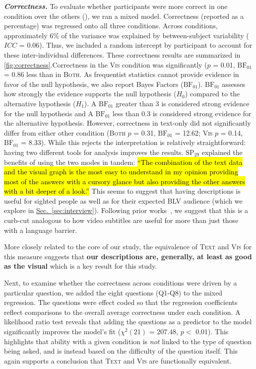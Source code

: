 \documentclass{egpubl}
\newcommand{\secref}[1]{\hyperref[#1]{Sec.~\ref*{#1}}}
\newcommand{\hlc}[2][yellow]{{\colorlet{foo}{#1}\sethlcolor{foo}\hl{#2}}}
\newcommand\sqt[1]{\hlc[surveyQuoteColor!20]{``#1''}}
\newcommand{\condition}[1]{\textsc{#1}}
\newcommand{\condVis}{\condition{Vis}}
\newcommand{\condText}{\condition{Text}}
\newcommand{\condBoth}{\condition{Both}}
\newcommand{\sx}[1]{SP$_{#1}$}
\newcommand{\parahead}[1]
{\vspace{0.25em}\noindent \textbf{\textit{#1.}}}
\begin{document}
\parahead{Correctness}
To evaluate whether participants were more correct in one condition over the others (\hAcc{}), we ran a mixed model. Correctness (reported as a percentage) was regressed onto all three conditions. Across conditions, approximately 6\% of the variance was explained by between-subject variability ($ICC$ = 0.06). Thus, we included a random intercept by participant to account for these inter-individual differences.
These correctness results are summarized in \autoref{fig:correctness}.Correctness in the \condVis{} condition was significantly ($p$ = 0.01, $\text{BF}_{\text{01}}$ = 0.86 less than in \condBoth{}.
As frequentist statistics cannot provide evidence in favor of the null hypothesis, we also report Bayes Factors ($\text{BF}_{\text{01}}$). $\text{BF}_{\text{01}}$ assesses how strongly the evidence supports the null hypothesis ($H_{0}$) compared to the alternative hypothesis ($H_{1}$). A $\text{BF}_{\text{01}}$ greater than 3 is considered strong evidence for the null hypothesis and A $\text{BF}_{\text{01}}$ less than 0.3 is considered strong evidence for the alternative hypothesis.
However, correctness in text-only did not significantly differ from either other condition (\condBoth{} $p$ = 0.31, $\text{BF}_{\text{01}}$ = 12.62; \condVis{} $p$ = 0.14, $\text{BF}_{\text{01}}$ = 8.33).
While this rejects \hAcc{} the interpretation is relatively straightforward: having two different tools for analysis improves the results.
\sx{29} explained the benefits of using the two modes in tandem: \sqt{The combination of the text data and the visual graph is the most easy to understand in my opinion providing most of the answers with a cursory glance but also providing the other answers with a bit deeper of a look.}
This seems to suggest that having descriptions is useful for sighted people as well as for their expected BLV audience (which we explore in \secref{sec:interview}).
Following prior works~\cite{lundgard_accessible_2022, prasad_text_2012}, we suggest that this is a curb-cut analogous to how video subtitles are useful for more than just those with a language barrier.

More closely related to the core of our study, the equivalence of \condText{} and \condVis{} for this measure suggests that \textbf{our descriptions are, generally, at least as good as the visual} which is a key result for this study.


Next, to examine whether the correctness across conditions were driven by a particular question, we added the eight questions (Q1-Q8) to the mixed regression. The questions were effect coded so that the regression coefficients reflect comparisons to the overall average correctness under each condition. A likelihood ratio test reveals that adding the questions as a predictor to the model significantly improves the model's fit ($\chi^2(21)$ = 207.48, $p <$ 0.01).
This highlights that ability with a given condition is \emph{not} linked to the type of question being asked, and is instead based on the difficulty of the question itself.
This again supports a conclusion that \condText{} and \condVis{} are functionally equivalent.
\end{document}

